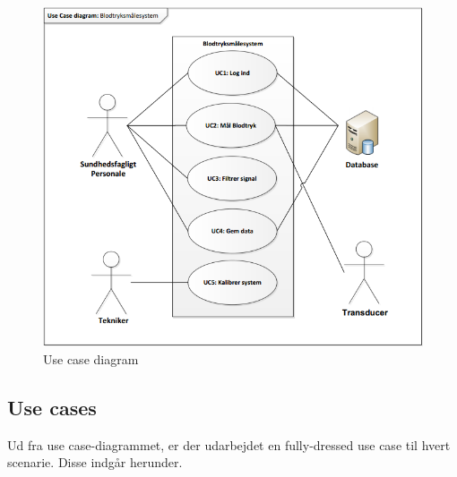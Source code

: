 \begin{figure}[H]
\centering
\includegraphics[scale=0.90]{uc.PNG}
\caption{Use case diagram}
\end{figure}

\newpage

\subsection{Use cases}
Ud fra use case-diagrammet, er der udarbejdet en fully-dressed use case til hvert scenarie. Disse indgår herunder. 
\\


